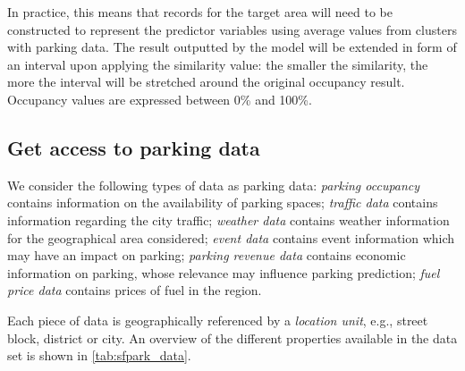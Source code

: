 \documentclass{ws-ijait}
\begin{document}
\begin{enumerate}[label=\Roman*]
		In practice, this means that records for the target area will need to be constructed to represent the predictor variables using average values from clusters with parking data. The result outputted by the model will be extended in form of an interval upon applying the similarity value: the smaller the similarity, the more the interval will be stretched around the original occupancy result. Occupancy values are expressed between 0\% and 100\%.
		
	\end{enumerate}
	
	\subsection{Get access to parking data}
	We consider the following types of data as parking data: \textit{parking occupancy} contains information on the availability of parking spaces; \textit{traffic data} contains information regarding the city traffic; \textit{weather data} contains weather information for the geographical area considered; \textit{event data} contains event information which may have an impact on parking; \textit{parking revenue data} contains economic information on parking, whose relevance may influence parking prediction; \textit{fuel price data} contains prices of fuel in the region.
	
	Each piece of data is geographically referenced by a \textit{location unit}, e.g., street block, district or city. 
	An overview of the different properties available in the data set is shown in \cref{tab:sfpark_data}.
	
\end{document}
